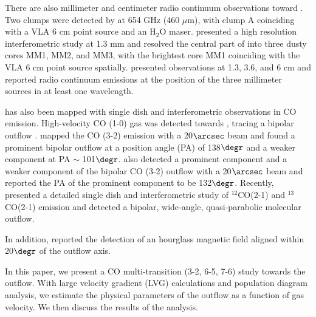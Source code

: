 There are also millimeter and centimeter radio continuum observations toward . Two clumps were detected by \citet{2007ApJ...654L..87C} at 654 GHz (460 $\mu$m), with clump A coinciding with a VLA 6 cm point source \citep{1993AJ....105.1495H} and an H$_2$O maser. \citet{2009ApJ...696...66Q} presented a high resolution interferometric study at 1.3 mm and resolved the central part of  into three dusty cores MM1, MM2, and MM3, with the brightest core MM1 coinciding with the VLA 6 cm point source spatially. \citet{2011AJ....142..147T} presented observations at 1.3, 3.6, and 6 cm and reported radio continuum emissions at the position of the three millimeter sources in at least one wavelength.

 has also been mapped with single dish and interferometric observations in CO emission. High-velocity CO (1-0) gas was detected towards  \citep{1991AJ....101.1435M,1996ApJ...457..267S}, tracing a bipolar outflow \citep{1996ApJ...457..267S}. \citet{1997PhDT........21H} mapped the CO (3-2) emission with a 20${\arcsec}$ beam and found a prominent bipolar outflow at a position angle (PA) of 138${\degr}$ and a weaker component at PA $\sim$ 101${\degr}$. \citet{2003A&A...412..175K} also detected a prominent component and a weaker component of the bipolar CO (3-2) outflow with a 20${\arcsec}$ beam and reported the PA of the prominent component to be 132${\degr}$. Recently, \citet{2009ApJ...696...66Q} presented a detailed single dish and interferometric study of $^{12}$CO(2-1) and $^{13}$CO(2-1) emission and detected a bipolar, wide-angle, quasi-parabolic molecular outflow. 

In addition, \citet{2014ApJ...794L..18Q} reported the detection of an hourglass magnetic field aligned within 20${\degr}$ of the outflow axis.

In this paper, we present a CO multi-transition (3-2, 6-5, 7-6) study towards the  outflow. With large velocity gradient (LVG) calculations and population diagram analysis, we estimate the physical parameters of the outflow as a function of gas velocity. We then discuss the results of the analysis.


